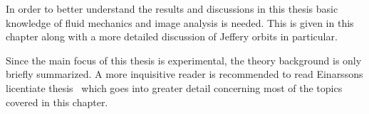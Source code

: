 In order to better understand the results and discussions in this thesis basic knowledge of fluid mechanics and image analysis is needed. This is given in this chapter along with a more detailed discussion of Jeffery orbits in particular. 

Since the main focus of this thesis is experimental, the theory background is only briefly summarized. A more inquisitive reader is recommended to read Einarssons licentiate thesis~\cite{JonasLic} which goes into greater detail concerning most of the topics covered in this chapter.